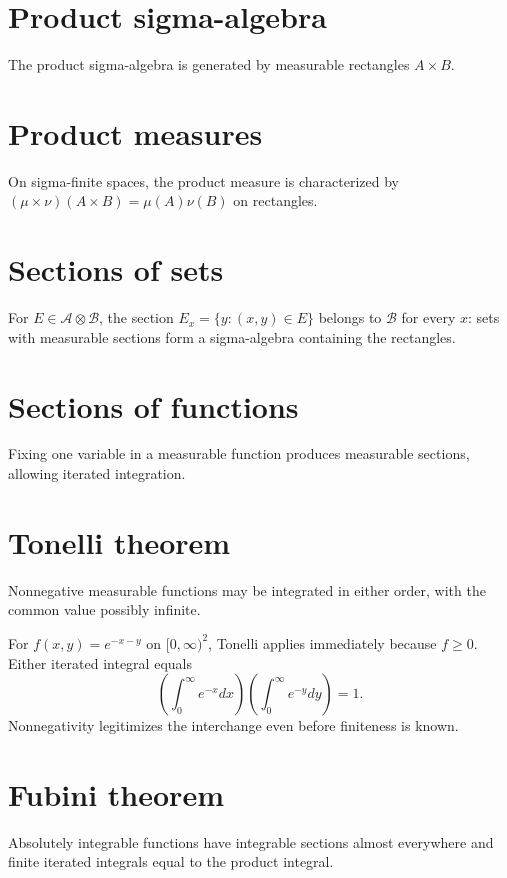 \section{Product sigma-algebra}
The product sigma-algebra is generated by measurable rectangles $A\times B$.

\section{Product measures}
On sigma-finite spaces, the product measure is characterized by $(\mu\times\nu)(A\times B)=\mu(A)\nu(B)$ on rectangles.

\section{Sections of sets}
For $E\in\mathcal A\otimes\mathcal B$, the section $E_x=\{y:(x,y)\in E\}$ belongs to $\mathcal B$ for every $x$: sets with measurable sections form a sigma-algebra containing the rectangles.

\section{Sections of functions}
Fixing one variable in a measurable function produces measurable sections, allowing iterated integration.

\section{Tonelli theorem}
Nonnegative measurable functions may be integrated in either order, with the common value possibly infinite.


\begin{example}\label{ex:iii05-expand-01}
For \(f(x,y)=e^{-x-y}\) on \([0,\infty)^2\), Tonelli applies immediately
because \(f\ge0\). Either iterated integral equals
\[
\left(\int_0^\infty e^{-x}dx\right)
\left(\int_0^\infty e^{-y}dy\right)=1.
\]
Nonnegativity legitimizes the interchange even before finiteness is known.
\end{example}
\section{Fubini theorem}
Absolutely integrable functions have integrable sections almost everywhere and finite iterated integrals equal to the product integral.


